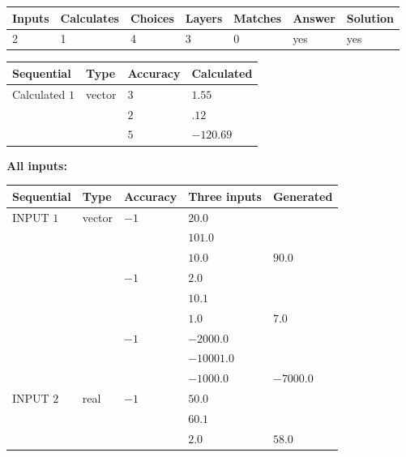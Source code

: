\documentclass[12pt]{article}
\begin{document}
 

 
 
\vspace{0.3in}
   
   
   
   
\noindent\begin{tabular}{|l|l|l|l|l|l|l|}
 \hline
Inputs & Calculates & Choices & Layers & Matches & Answer & Solution \\ \hline
           2 & 
           1 & 
           4
  & 
           3 & 
           0 & 
  yes & 
  yes 
  \\ \hline
 \end{tabular}
   
   
   
   
\noindent{}
   
   
  
  
\noindent\begin{tabular}{|l|l|l|l|}
\hline
 Sequential & Type & Accuracy & Calculated \\ 
\hline
 
 
  Calculated $           1$ & vector &  
  $           3 $ 
 &  $ 1.55 $ 
 \\    
  & & 
  $           2 $ 
 &  $ .12 $ 
 \\    
  & & 
  $           5 $ 
 &  $ -120.69 $ 
 \\  \hline  
 \end{tabular}
   
   
   
   
\noindent\vspace{0.1in}\hspace{-0.08in} {\textbf{\Large{All inputs: }}}
   
   
  
  
\noindent\begin{tabular}{|l|l|l|l|l|}
\hline
 Sequential & Type & Accuracy & Three inputs & Generated \\ 
\hline
 
 
  INPUT $           1$ & vector & $          -1 $ & $
20.0
  $ & \\
  & & & $
101.0
  $ & \\
  & & & $
10.0
$ & $ 90.0 $ 
  \\
  & & $          -1 $ & $
2.0
  $ & \\
  & & & $
10.1
  $ & \\
  & & & $
1.0
$ & $ 7.0 $ 
  \\
  & & $          -1 $ & $
-2000.0
  $ & \\
  & & & $
-10001.0
  $ & \\
  & & & $
-1000.0
$ & $ -7000.0 $ 
 \\  \hline  
 
 
  INPUT $           2$ & real & $          -1 $ & $
 50.0
  $ & \\
  & & &  $
 60.1
  $ & \\
  & & &  $
 2.0
 $ & $ 58.0 $ 
 \\  \hline  
 \end{tabular}
   
\end{document}
